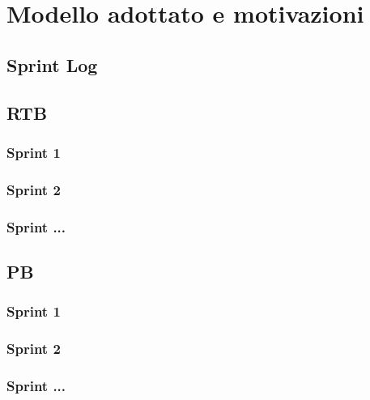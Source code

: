 \documentclass{article}
\begin{document}
\newpage
\section{Modello adottato e motivazioni}
    \subsection{Sprint Log}
        \subsection{RTB}
            \subsubsection{Sprint 1}
            \subsubsection{Sprint 2}
            \subsubsection{Sprint ...}
        \subsection{PB}
            \subsubsection{Sprint 1}
            \subsubsection{Sprint 2}
            \subsubsection{Sprint ...}

\end{document}
